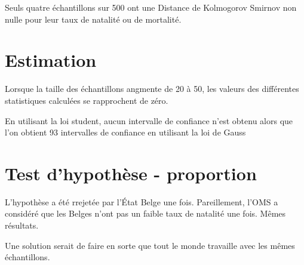 \documentclass[a4paper,10pt]{article}
\begin{document}
Seuls quatre échantillons sur 500 ont une Distance de Kolmogorov Smirnov non nulle pour leur taux de natalité ou de mortalité.

\section{Estimation}

Lorsque la taille des échantillons angmente de 20 à 50, les valeurs des différentes statistiques calculées se rapprochent de zéro.


En utilisant la loi student, aucun intervalle de confiance n'est obtenu alors que l'on obtient 93 intervalles de confiance en utilisant la loi de Gauss

\section{Test d'hypothèse - proportion}


L'hypothèse a été rrejetée par l'État Belge une fois. Pareillement, l'OMS a considéré que les Belges n'ont pas un faible taux de natalité une fois. Mêmes résultats.


Une solution serait de faire en sorte que tout le monde travaille avec les mêmes échantillons.
	
\end{document}
